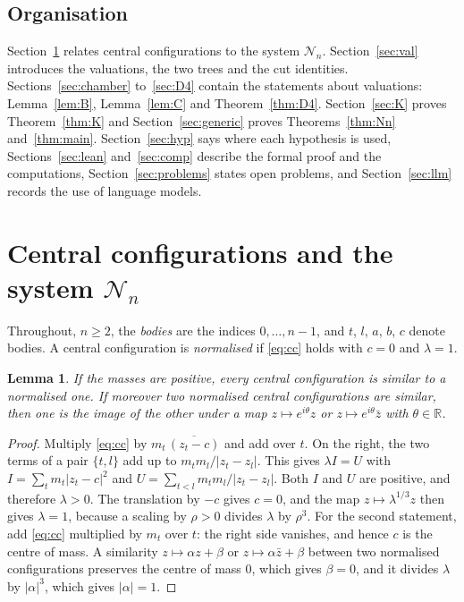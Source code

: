 \documentclass[11pt]{amsart}
\newtheorem{lemma}[theorem]{Lemma}
\theoremstyle{definition}
\theoremstyle{remark}
\numberwithin{equation}{section}
\newcommand{\RR}{\mathbb{R}}
\newcommand{\cN}{\mathcal{N}}
\begin{document}
\subsection*{Organisation} Section~\ref{sec:system} relates central configurations to the system
$\cN_n$. Section~\ref{sec:val} introduces the valuations, the two trees and the cut identities.
Sections~\ref{sec:chamber} to~\ref{sec:D4} contain the statements about valuations: Lemma~\ref{lem:B},
Lemma~\ref{lem:C} and Theorem~\ref{thm:D4}. Section~\ref{sec:K} proves Theorem~\ref{thm:K} and
Section~\ref{sec:generic} proves Theorems~\ref{thm:Nn} and~\ref{thm:main}. Section~\ref{sec:hyp} says
where each hypothesis is used, Sections~\ref{sec:lean} and~\ref{sec:comp} describe the formal proof and
the computations, Section~\ref{sec:problems} states open problems, and Section~\ref{sec:llm} records the
use of language models.

\section{Central configurations and the system \texorpdfstring{$\cN_n$}{N\_n}}\label{sec:system}

Throughout, $n \ge 2$, the \emph{bodies} are the indices $0, \dots, n-1$, and $t$, $l$, $a$, $b$, $c$
denote bodies. A central configuration is \emph{normalised} if \eqref{eq:cc} holds with $c = 0$ and
$\lambda = 1$.

\begin{lemma}\label{lem:norm}
If the masses are positive, every central configuration is similar to a normalised one. If moreover two
normalised central configurations are similar, then one is the image of the other under a map
$z \mapsto e^{i\theta} z$ or $z \mapsto e^{i\theta} \bar z$ with $\theta \in \RR$.
\end{lemma}

\begin{proof}
Multiply \eqref{eq:cc} by $m_t\, \overline{(z_t - c)}$ and add over $t$. On the right, the two terms of a
pair $\{t, l\}$ add up to $m_t m_l / |z_t - z_l|$. This gives $\lambda I = U$ with
$I = \sum_t m_t |z_t - c|^2$ and $U = \sum_{t < l} m_t m_l / |z_t - z_l|$. Both $I$ and $U$ are positive,
and therefore $\lambda > 0$. The translation by $-c$ gives $c = 0$, and the map
$z \mapsto \lambda^{1/3} z$ then gives $\lambda = 1$, because a scaling by $\rho > 0$ divides $\lambda$
by $\rho^{3}$. For the second statement, add \eqref{eq:cc} multiplied by $m_t$ over $t$: the right side
vanishes, and hence $c$ is the centre of mass. A similarity $z \mapsto \alpha z + \beta$ or
$z \mapsto \alpha \bar z + \beta$ between two normalised configurations preserves the centre of mass
$0$, which gives $\beta = 0$, and it divides $\lambda$ by $|\alpha|^{3}$, which gives $|\alpha| = 1$.
\end{proof}
\end{document}
